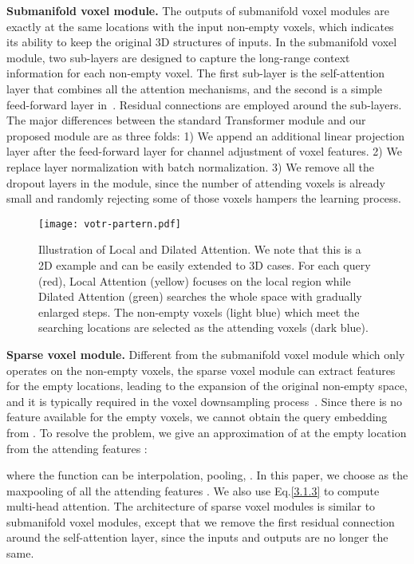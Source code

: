 \documentclass[10pt,twocolumn,letterpaper]{article}
\begin{document}
\textbf{Submanifold voxel module.} The outputs of submanifold voxel modules are exactly at the same locations with the input non-empty voxels, which indicates its ability to keep the original 3D structures of inputs. In the submanifold voxel module, two sub-layers are designed to capture the long-range context information for each non-empty voxel. The first sub-layer is the self-attention layer that combines all the attention mechanisms, and the second is a simple feed-forward layer in~\cite{vaswani2017attention}. Residual connections are employed around the sub-layers. The major differences between the standard Transformer module and our proposed module are as three folds: 1) We append an additional linear projection layer after the feed-forward layer for channel adjustment of voxel features. 2) We replace layer normalization with batch normalization. 3) We remove all the dropout layers in the module, since the number of attending voxels is already small and randomly rejecting some of those voxels hampers the learning process.

\begin{figure}[!t]
\centering
\texttt{[image: votr-partern.pdf]}
\caption{Illustration of Local and Dilated Attention. We note that this is a 2D example and can be easily extended to 3D cases. For each query (red), Local Attention (yellow) focuses on the local region while Dilated Attention (green) searches the whole space with gradually enlarged steps. The non-empty voxels (light blue) which meet the searching locations are selected as the attending voxels (dark blue).}
\label{fig_attention}
\end{figure}

\textbf{Sparse voxel module.} Different from the submanifold voxel module which only operates on the non-empty voxels, the sparse voxel module can extract features for the empty locations, leading to the expansion of the original non-empty space, and it is typically required in the voxel downsampling process~\cite{yan2018second}. Since there is no feature  available for the empty voxels, we cannot obtain the query embedding  from . To resolve the problem, we give an approximation of  at the empty location from the attending features :

where the function  can be interpolation, pooling, \etc. In this paper, we choose  as the maxpooling of all the attending features . We also use Eq.\ref{3.1.3} to compute multi-head attention. The architecture of sparse voxel modules is similar to submanifold voxel modules, except that we remove the first residual connection around the self-attention layer, since the inputs and outputs are no longer the same.
\end{document}
